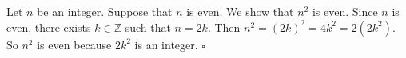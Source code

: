 Let $n$ be an integer.
Suppose that $n$ is even.
We show that $n^{2}$ is even.
Since $n$ is even, there exists $k \in \mathbb{Z}$ such that $n = 2k$.
Then $n^{2} = (2k)^{2} = 4k^{2} = 2(2k^{2})$.
So $n^{2}$ is even because $2k^{2}$ is an integer. \hfill$\square$